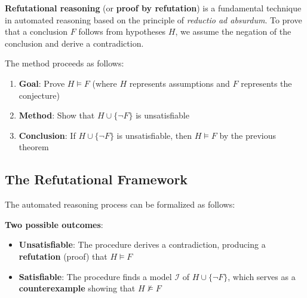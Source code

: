 \documentclass[11pt,a4paper]{article}
\theoremstyle{definition}
\theoremstyle{plain}
\theoremstyle{remark}
\begin{document}
\textbf{Refutational reasoning} (or \textbf{proof by refutation}) is a fundamental technique in automated reasoning based on the principle of \textit{reductio ad absurdum}. To prove that a conclusion $F$ follows from hypotheses $H$, we assume the negation of the conclusion and derive a contradiction.

The method proceeds as follows:
\begin{enumerate}
    \item \textbf{Goal}: Prove $H \models F$ (where $H$ represents assumptions and $F$ represents the conjecture)
    \item \textbf{Method}: Show that $H \cup \{\neg F\}$ is unsatisfiable
    \item \textbf{Conclusion}: If $H \cup \{\neg F\}$ is unsatisfiable, then $H \models F$ by the previous theorem
\end{enumerate}

\subsection{The Refutational Framework}

The automated reasoning process can be formalized as follows:

\begin{center}
\end{center}

\textbf{Two possible outcomes}:
\begin{itemize}
    \item \textbf{Unsatisfiable}: The procedure derives a contradiction, producing a \textbf{refutation} (proof) that $H \models F$
    \item \textbf{Satisfiable}: The procedure finds a model $\mathcal{I}$ of $H \cup \{\neg F\}$, which serves as a \textbf{counterexample} showing that $H \not\models F$
\end{itemize}
\end{document}
